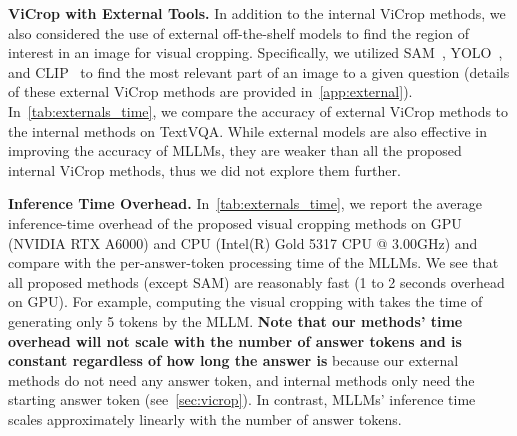 \textbf{ViCrop with External Tools.}
In addition to the internal ViCrop methods, we also considered the use of external off-the-shelf models to find the region of interest in an image for visual cropping. Specifically, we utilized SAM~\citep{kirillov2023segment}, YOLO~\citep{yolo}, and CLIP~\citep{clip} to find the most relevant part of an image to a given question (details of these external ViCrop methods are provided in~\cref{app:external}). In~\cref{tab:externals_time}, we compare the accuracy of external ViCrop methods to the internal methods on TextVQA. While external models are also effective in improving the accuracy of MLLMs, they are weaker than all the proposed internal ViCrop methods, thus we did not explore them further.



\textbf{Inference Time Overhead.}
In~\cref{tab:externals_time}, we report the average inference-time overhead of the proposed visual cropping methods on GPU (NVIDIA RTX A6000) and CPU (Intel(R) Gold 5317 CPU @ 3.00GHz) and compare with the per-answer-token processing time of the MLLMs.
We see that all proposed methods (except SAM) are reasonably fast (1 to 2 seconds overhead on GPU). For example, computing the visual cropping with \rel{} takes the time of generating only 5 tokens by the MLLM. \textbf{Note that our methods’ time overhead will not scale with the number of answer tokens and is constant regardless of how long the answer is} because our external methods do not need any answer token, and internal methods only need the starting answer token (see~\cref{sec:vicrop}). In contrast, MLLMs’ inference time scales approximately linearly with the number of answer tokens.
